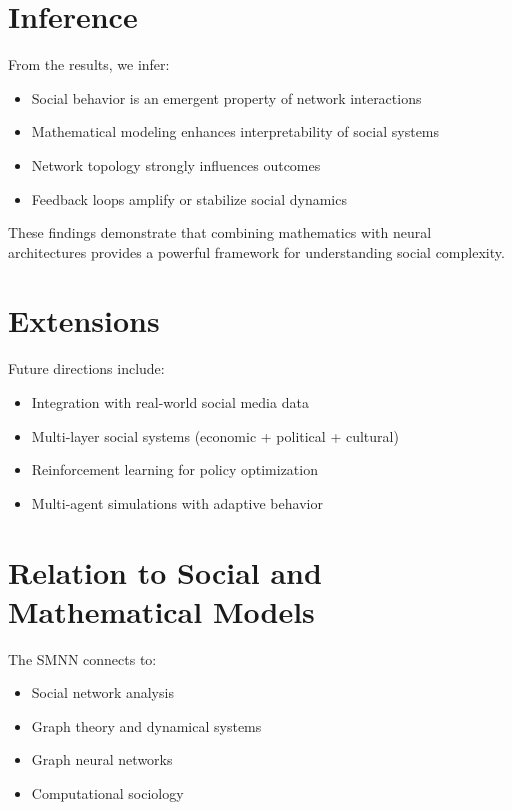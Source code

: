 \documentclass[12pt]{article}
\begin{document}
\section{Inference}

From the results, we infer:

\begin{itemize}
\item Social behavior is an emergent property of network interactions
\item Mathematical modeling enhances interpretability of social systems
\item Network topology strongly influences outcomes
\item Feedback loops amplify or stabilize social dynamics
\end{itemize}

These findings demonstrate that combining mathematics with neural architectures provides a powerful framework for understanding social complexity.

\section{Extensions}

Future directions include:

\begin{itemize}
\item Integration with real-world social media data
\item Multi-layer social systems (economic + political + cultural)
\item Reinforcement learning for policy optimization
\item Multi-agent simulations with adaptive behavior
\end{itemize}

\section{Relation to Social and Mathematical Models}

The SMNN connects to:

\begin{itemize}
\item Social network analysis
\item Graph theory and dynamical systems
\item Graph neural networks
\item Computational sociology
\end{itemize}
\end{document}

